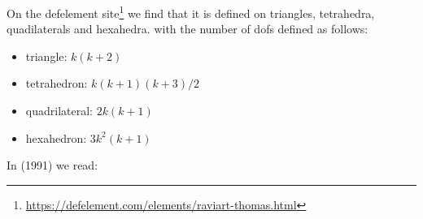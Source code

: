 On the defelement site\footnote{\url{https://defelement.com/elements/raviart-thomas.html}} we find 
that it is defined on triangles, tetrahedra, quadilaterals and hexahedra.
with the number of dofs defined as follows:
\begin{itemize}
\item triangle: $k(k+2)$
\item tetrahedron: $k(k+1)(k+3)/2$
\item quadrilateral: $2k(k+1)$
\item hexahedron: $3k^2(k+1)$
\end{itemize}

In \textcite{brfo} (1991) we read:


